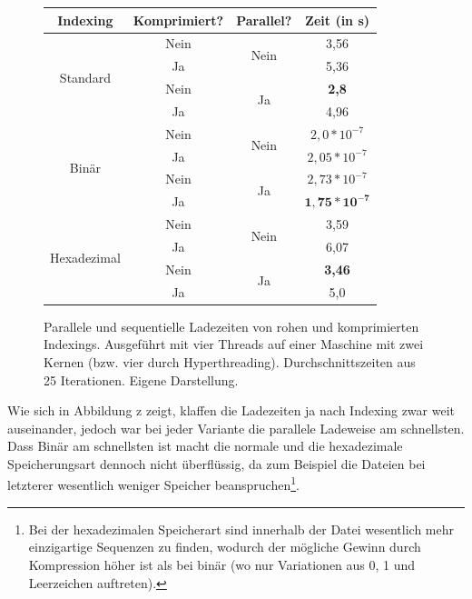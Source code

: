 \documentclass[a4paper,12pt]{scrartcl}
\begin{document}
    \begin{figure}[h]
        \centering
        \begin{tabular}{c||c|c|c}
            Indexing & Komprimiert? & Parallel? & Zeit (in s) \\
            \hline \hline
            \multirow{4}{*}{Standard} & \textcolor{BrickRed}{Nein} & \multirow{2}{*}{\textcolor{BrickRed}{Nein}} & 3,56 \\
            & \textcolor{OliveGreen}{Ja} & & 5,36 \\ \cline{2-3}
            & \textcolor{BrickRed}{Nein} & \multirow{2}{*}{\textcolor{OliveGreen}{Ja}} & \textbf{2,8} \\
            & \textcolor{OliveGreen}{Ja} & & 4,96 \\
            \hline
            \multirow{4}{*}{Binär} & \textcolor{BrickRed}{Nein} & \multirow{2}{*}{\textcolor{BrickRed}{Nein}} & $2,0 * 10^{-7}$\\
            & \textcolor{OliveGreen}{Ja} & & $2,05 * 10^{-7}$ \\ \cline{2-3}
            & \textcolor{BrickRed}{Nein} & \multirow{2}{*}{\textcolor{OliveGreen}{Ja}} & $2,73 * 10^{-7}$ \\
            & \textcolor{OliveGreen}{Ja} & & $\mathbf{1,75 * 10^{-7}}$ \\
            \hline
            \multirow{4}{*}{Hexadezimal} & \textcolor{BrickRed}{Nein} & \multirow{2}{*}{\textcolor{BrickRed}{Nein}} & 3,59 \\
            & \textcolor{OliveGreen}{Ja} & & 6,07 \\ \cline{2-3}
            & \textcolor{BrickRed}{Nein} & \multirow{2}{*}{\textcolor{OliveGreen}{Ja}} & \textbf{3,46} \\
            & \textcolor{OliveGreen}{Ja} & & 5,0 \\
        \end{tabular}
        \caption{Parallele und sequentielle Ladezeiten von rohen und komprimierten Indexings. Ausgeführt mit vier Threads auf einer Maschine mit zwei Kernen (bzw. vier durch Hyperthreading). Durchschnittszeiten aus 25 Iterationen. Eigene Darstellung.}
    \end{figure}

    Wie sich in Abbildung z zeigt, klaffen die Ladezeiten ja nach Indexing zwar weit auseinander, jedoch war bei jeder Variante die parallele Ladeweise am schnellsten. Dass Binär am schnellsten ist macht die normale und die hexadezimale Speicherungsart dennoch nicht überflüssig, da zum Beispiel die Dateien bei letzterer wesentlich weniger Speicher beanspruchen\footnote{Bei der hexadezimalen Speicherart sind innerhalb der Datei wesentlich mehr einzigartige Sequenzen zu finden, wodurch der mögliche Gewinn durch Kompression höher ist als bei binär (wo nur Variationen aus 0, 1 und Leerzeichen auftreten).}. 
\end{document}
